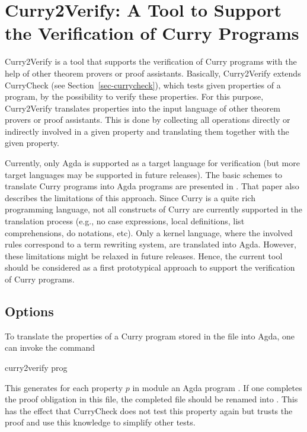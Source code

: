 \section{Curry2Verify: A Tool to Support the Verification of Curry Programs}
\label{sec-curry2verify}

Curry2Verify
is a tool that supports the verification of Curry programs
with the help of other theorem provers or proof assistants.
Basically, Curry2Verify extends CurryCheck (see Section~\ref{sec-currycheck}),
which tests given properties of a program,
by the possibility to verify these properties.
For this purpose, Curry2Verify translates properties
into the input language of other theorem provers or proof assistants.
This is done by collecting all operations directly or indirectly
involved in a given property and translating them together with
the given property.

Currently, only Agda \cite{Norell09} is supported as
a target language for verification (but more target languages
may be supported in future releases).
The basic schemes to translate Curry programs into Agda programs
are presented in \cite{AntoyHanusLibby16}.
That paper also describes the limitations of this approach.
Since Curry is a quite rich programming language,
not all constructs of Curry are currently supported
in the translation process (e.g., no case expressions,
local definitions, list comprehensions, do notations, etc).
Only a kernel language, where the involved rules
correspond to a term rewriting system, are translated into Agda.
However, these limitations might be relaxed in future releases.
Hence, the current tool should be considered as a first prototypical
approach to support the verification of Curry programs.

\subsection{Options}

To translate the properties of a Curry program stored
in the file  into Agda,
one can invoke the command
%
\begin{curry}
curry2verify prog
\end{curry}
%
This generates for each property $p$ in module 
an Agda program .
If one completes the proof obligation in this file,
the completed file should be renamed into
.
This has the effect that CurryCheck does not test this property again
but trusts the proof and use this knowledge to simplify other tests.


